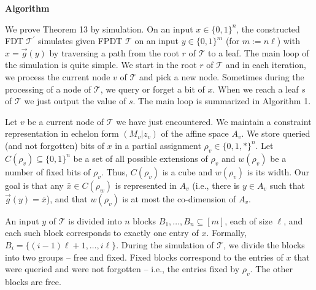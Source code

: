\documentclass[10pt,a4paper]{article}
\begin{document}




\par\medskip\noindent\textbf{Algorithm}\par




We prove Theorem 13 by simulation.
On an input $x\in\{0,1\}^{n}$, the constructed FDT $\mathcal{T}^{\prime}$ simulates given FPDT $\mathcal{T}$ on an input $y\in\{0,1\}^{m}$ (for $m:=n\ell$) with $x=\overrightarrow{g}(y)$ by traversing a path from the root $r$ of $\mathcal{T}$ to a leaf.
The main loop of the simulation is quite simple.
We start in the root $r$ of $\mathcal{T}$ and in each iteration, we process the current node $v$ of $\mathcal{T}$ and pick a new node.
Sometimes during the processing of a node of $\mathcal{T}$, we query or forget a bit of $x$.
When we reach a leaf $s$ of $\mathcal{T}$ we just output the value of $s$.
The main loop is summarized in Algorithm 1.\par




Let $v$ be a current node of $\mathcal{T}$ we have just encountered.
We maintain a constraint representation in echelon form $(M_{v}|z_{v})$ of the affine space $A_{v}$.
We store queried (and not forgotten) bits of $x$ in a partial assignment $\rho_{v}\in\{0,1,*\}^{n}$.
Let $C(\rho_{v})\subseteq\{0,1\}^{n}$ be a set of all possible extensions of $\rho_{v}$ and $w(\rho_{v})$ be a number of fixed bits of $\rho_{v}$.
Thus, $C(\rho_{v})$ is a cube and $w(\rho_{v})$ is its width.
Our goal is that any $\bar{x}\in C(\rho_{w})$ is represented in $A_{v}$ (i.e., there is $y\in A_{v}$ such that $\overrightarrow{g}(y)=\bar{x}$), and that $w(\rho_{v})$ is at most the co-dimension of $A_{v}$.\par




An input $y$ of $\mathcal{T}$ is divided into $n$ blocks $B_{1},\dots,B_{n}\subseteq[m]$, each of size $\ell$, and each such block corresponds to exactly one entry of $x$.
Formally, $B_{i}=\{(i-1)\ell+1,\dots,i\ell\}$.
During the simulation of $\mathcal{T}$, we divide the blocks into two groups – free and fixed.
Fixed blocks correspond to the entries of $x$ that were queried and were not forgotten – i.e., the entries fixed by $\rho_{v}$.
The other blocks are free.\par
\end{document}
